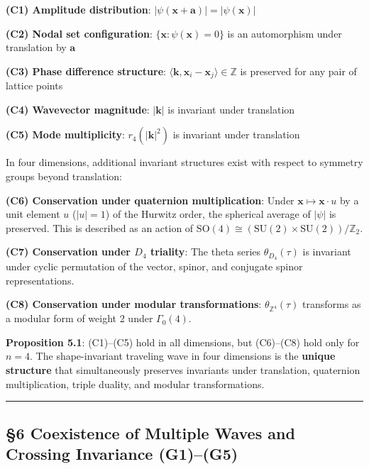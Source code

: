 \documentclass[
  a4paper,11pt]{article}
\theoremstyle{definition}
\theoremstyle{remark}
\begin{document}
\textbf{(C1) Amplitude distribution}:
\(|\psi(\mathbf{x} + \mathbf{a})| = |\psi(\mathbf{x})|\)

\textbf{(C2) Nodal set configuration}:
\(\{\mathbf{x} : \psi(\mathbf{x}) = 0\}\) is an automorphism under
translation by \(\mathbf{a}\)

\textbf{(C3) Phase difference structure}:
\(\langle \mathbf{k}, \mathbf{x}_i - \mathbf{x}_j \rangle \in \mathbb{Z}\)
is preserved for any pair of lattice points

\textbf{(C4) Wavevector magnitude}: \(|\mathbf{k}|\) is invariant under
translation

\textbf{(C5) Mode multiplicity}: \(r_4(|\mathbf{k}|^2)\) is invariant
under translation

In four dimensions, additional invariant structures exist with respect
to symmetry groups beyond translation:

\textbf{(C6) Conservation under quaternion multiplication}: Under
\(\mathbf{x} \mapsto \mathbf{x} \cdot u\) by a unit element \(u\)
(\(|u| = 1\)) of the Hurwitz order, the spherical average of \(|\psi|\)
is preserved. This is described as an action of
\(\mathrm{SO}(4) \cong (\mathrm{SU}(2) \times \mathrm{SU}(2))/\mathbb{Z}_2\).

\textbf{(C7) Conservation under \(D_4\) triality}: The theta series
\(\theta_{D_4}(\tau)\) is invariant under cyclic permutation of the
vector, spinor, and conjugate spinor representations.

\textbf{(C8) Conservation under modular transformations}:
\(\theta_{\mathbb{Z}^4}(\tau)\) transforms as a modular form of weight 2
under \(\Gamma_0(4)\).

\textbf{Proposition 5.1}: (C1)--(C5) hold in all dimensions, but
(C6)--(C8) hold only for \(n = 4\). The shape-invariant traveling wave
in four dimensions is the \textbf{unique structure} that simultaneously
preserves invariants under translation, quaternion multiplication,
triple duality, and modular transformations.

\begin{center}\rule{0.5\linewidth}{0.5pt}\end{center}

\subsection{§6 Coexistence of Multiple Waves and Crossing Invariance
(G1)--(G5)}\label{coexistence-of-multiple-waves-and-crossing-invariance-g1g5}
\end{document}
